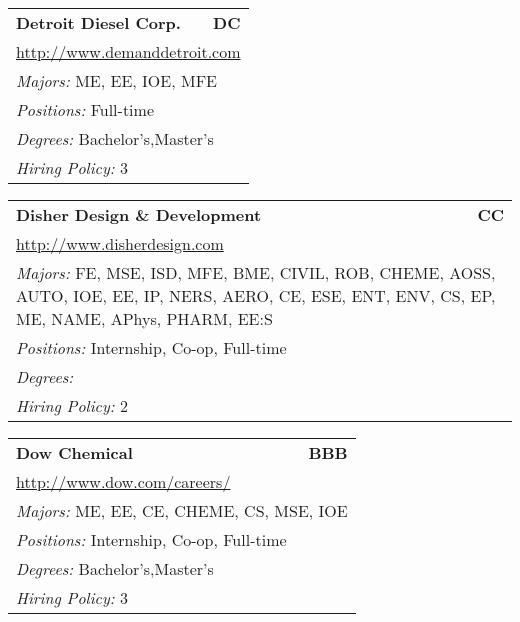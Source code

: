 \documentclass[twoside]{article}
\begin{document}
\begin{center}
\begin{multicols}{3}
\begin{FlushLeft}
\begin{minipage}{\columnwidth}
\end{minipage}
 
\begin{minipage}{\columnwidth}\begin{tabularx}{.95\columnwidth}{Xr}
                 {\Large\bf Detroit Diesel Corp.} & {\Large\bf DC}\\
    \multicolumn{2}{p{.95\columnwidth}}{\url{http://www.demanddetroit.com}}\\
    \multicolumn{2}{p{.95\columnwidth}}{\emph{Majors:} ME, EE, IOE, MFE}\\
    \multicolumn{2}{p{.95\columnwidth}}{\emph{Positions:} Full-time}\\
    \multicolumn{2}{p{.95\columnwidth}}{\emph{Degrees:} Bachelor's,Master's}\\
    \multicolumn{2}{p{.95\columnwidth}}{\emph{Hiring Policy:} 3}\\
    \end{tabularx}
    
\end{minipage}
 
\begin{minipage}{\columnwidth}\begin{tabularx}{.95\columnwidth}{Xr}
                 {\Large\bf Disher Design \& Development} & {\Large\bf CC}\\
    \multicolumn{2}{p{.95\columnwidth}}{\url{http://www.disherdesign.com}}\\
    \multicolumn{2}{p{.95\columnwidth}}{\emph{Majors:} FE, MSE, ISD, MFE, BME, CIVIL, ROB, CHEME, AOSS, AUTO, IOE, EE, IP, NERS, AERO, CE, ESE, ENT, ENV, CS, EP, ME, NAME, APhys, PHARM, EE:S}\\
    \multicolumn{2}{p{.95\columnwidth}}{\emph{Positions:} Internship, Co-op, Full-time}\\
    \multicolumn{2}{p{.95\columnwidth}}{\emph{Degrees:} }\\
    \multicolumn{2}{p{.95\columnwidth}}{\emph{Hiring Policy:} 2}\\
    \end{tabularx}
    
\end{minipage}
 
\begin{minipage}{\columnwidth}\begin{tabularx}{.95\columnwidth}{Xr}
                 {\Large\bf Dow Chemical} & {\Large\bf BBB}\\
    \multicolumn{2}{p{.95\columnwidth}}{\url{http://www.dow.com/careers/}}\\
    \multicolumn{2}{p{.95\columnwidth}}{\emph{Majors:} ME, EE, CE, CHEME, CS, MSE, IOE}\\
    \multicolumn{2}{p{.95\columnwidth}}{\emph{Positions:} Internship, Co-op, Full-time}\\
    \multicolumn{2}{p{.95\columnwidth}}{\emph{Degrees:} Bachelor's,Master's}\\
    \multicolumn{2}{p{.95\columnwidth}}{\emph{Hiring Policy:} 3}\\
    \end{tabularx}
    

\end{minipage}
\end{FlushLeft}
\end{multicols}
\end{center}
\end{document}
